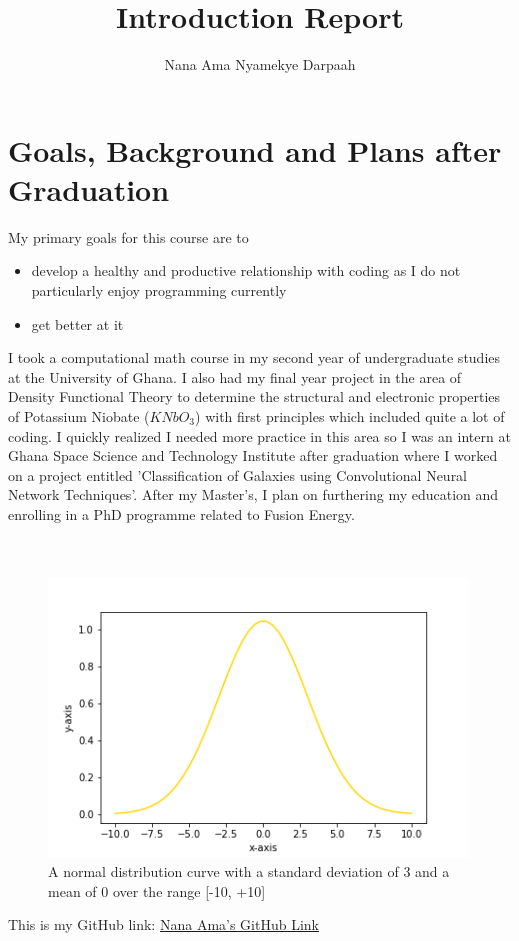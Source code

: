 \documentclass[11pt]{article}
\title{Introduction Report}
\author{Nana Ama Nyamekye Darpaah}
\begin{document}
	
	\maketitle
	
\section{Goals, Background and Plans after Graduation}

My primary goals for this course are to 
\begin{itemize}
	\item develop a healthy and productive relationship with coding as I do not particularly enjoy programming currently
	 
	\item  get better at it 
	
\end{itemize}
I took a computational math course in my second year of undergraduate studies at the University of Ghana. I also had my final year project in the area of Density Functional Theory to determine the structural and electronic properties of Potassium Niobate ($KNbO_{3}$) with first principles which included quite a lot of coding. I quickly realized I needed more practice in this area so I was an intern at Ghana Space Science and Technology Institute after graduation where I worked on a project entitled 'Classification of Galaxies using Convolutional Neural Network Techniques'. After my Master's, I plan on furthering my education and enrolling in a PhD programme related to Fusion Energy.\\
\\
\\
\begin{figure}[h]\begin{center} 
		\vspace{12pt}
		\includegraphics[width=0.99\textwidth]{gaussian.png}
		\caption{A normal distribution curve with a standard deviation of 3 and a mean of 0 over the range [-10, +10] }
		\label{fig:normal curve} 
	\end{center}
\end{figure} 


This is my GitHub link: \href{https://github.com/nnd2016/phys-ga2000.git}{Nana Ama's GitHub Link}
\end{document}
